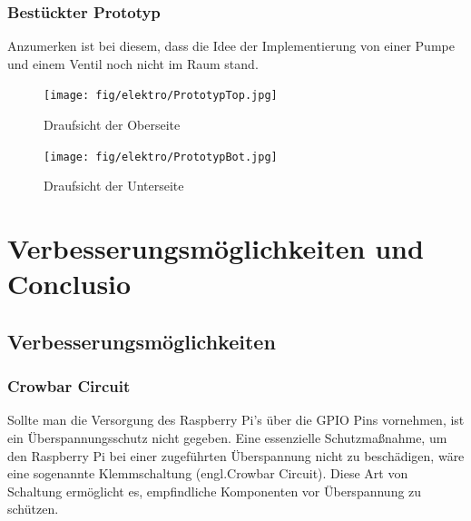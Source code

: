 \subsubsection{Bestückter Prototyp}

Anzumerken ist bei diesem, dass die Idee der Implementierung von einer Pumpe und einem Ventil noch nicht im Raum stand.

\begin{figure}[hb]
    \centering
    \texttt{[image: fig/elektro/PrototypTop.jpg]}
    \caption{Draufsicht der Oberseite}
\end{figure}

\begin{figure}[hb]
    \centering
    \texttt{[image: fig/elektro/PrototypBot.jpg]}
    \caption{Draufsicht der Unterseite}
\end{figure}


\newpage
\section{Verbesserungsmöglichkeiten und Conclusio}
\subsection{Verbesserungsmöglichkeiten}

\subsubsection{Crowbar Circuit}
Sollte man die Versorgung des Raspberry Pi's über die \acs{GPIO} Pins vornehmen, ist ein Überspannungsschutz nicht gegeben.
Eine essenzielle Schutzmaßnahme, um den Raspberry Pi bei einer zugeführten Überspannung nicht zu beschädigen, wäre eine sogenannte Klemmschaltung (engl.Crowbar Circuit).
Diese Art von Schaltung ermöglicht es, empfindliche Komponenten vor Überspannung zu schützen.

